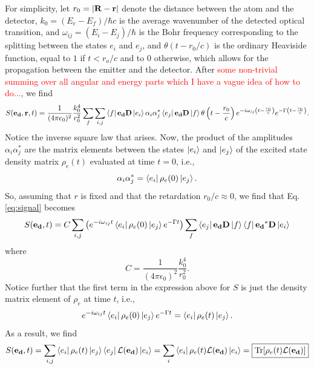 \documentclass[11pt]{article}
\newcommand{\lag}{\mathcal{L}}
\newcommand{\al}{\alpha}
\newcommand{\f}[2]{\frac{#1}{#2}}
\newcommand{\lp}{\left(}
\newcommand{\rp}{\right)}
\begin{document}
For simplicity, let $r_0 = \abs{\mathbf{R}-\mathbf{r}}$ denote the distance between the atom and the detector, $k_0 = (E_e - E_f)/\hbar c$ is the average wavenumber of the detected optical transition, and $\omega_{ij} = (E_i - E_j)/\hbar$ is the Bohr frequency corresponding to the splitting between the states $e_i$ and $e_j$, and $\theta (t - r_0/c)$ is the ordinary Heaviside function, equal to $1$ if $t< r_o/c$ and to $0$ otherwise, which allows for the propagation between the emitter and the detector. After \textcolor{red}{some non-trivial summing over all angular and energy parts which I have a vague idea of how to do...}, we find 
\begin{equation}\label{eq:signal}
S(\mathbf{e_d}, \mathbf{r},t) = \f{1}{(4\pi\epsilon_0)^2}\f{k_0^4}{r_0^2}\sum_{f}\sum_{i,j} \bra{f}\mathbf{e_d}  \mathbf{D} \ket{e_i}\al_i \al_j^* \bra{e_j} \mathbf{e_d} \mathbf{D}\ket{f} \theta\lp t - \f{r_0}{c} \rp e^{-i \omega_{ij}\lp t-\f{r_0}{c} \rp } e^{-\Gamma\lp t-\f{r_0}{c} \rp }.
\end{equation}
Notice the inverse square law that arises. Now, the product of the amplitudes $\al_i \al_j^*$ are the matrix elements between the states $\ket{e_i}$ and $\ket{e_j}$ of the excited state density matrix $\rho_e(t)$ evaluated at time $t=0$, i.e., 
\begin{equation*}
\al_i \al_j^* = \bra{e_i} \rho_e(0) \ket{e_j}.
\end{equation*}
So, assuming that $r$ is fixed and that the retardation $r_0/c \approx 0$, we find that Eq. \ref{eq:signal} becomes
\begin{equation}\label{eq:full_signal}
S(\mathbf{e_d},t) = C\sum_{i,j}\lp e^{-i\omega_{ij}t} \bra{e_i}\rho_e(0)\ket{e_j} e^{-\Gamma t} \rp
\sum_f \bra{e_j}\mathbf{e_d} \mathbf{D}\ket{f}\bra{f}\mathbf{e_d}^*\mathbf{D}\ket{e_i}  
\end{equation}
where
\begin{equation*}
C = \f{1}{(4\pi\epsilon_0)^2}\f{k_0^4}{r_0^2}.
\end{equation*}
Notice further that the first term in the expression above for $S$ is just the density matrix element of $\rho_e$ at time $t$, i.e., 
\begin{equation}\label{eq:densityT}
e^{-i\omega_{ij}t} \bra{e_i}\rho_e(0)\ket{e_j} e^{-\Gamma t} = \bra{e_i}\rho_e(t)\ket{e_j}.
\end{equation}
As a result, we find 
\begin{equation}\label{eq:SignalTrace}
S(\mathbf{e_d} ,t) = \sum_{i,j} \bra{e_i}\rho_e(t)\ket{e_j} \bra{e_j}\lag(\mathbf{e_d}) \ket{e_i} = \sum_i \bra{e_i} \rho_e(t)\lag(\mathbf{e_d}) \ket{e_i} = \boxed{\Tr[\rho_e(t)\lag(\mathbf{e_d})]}
\end{equation}
\end{document}
